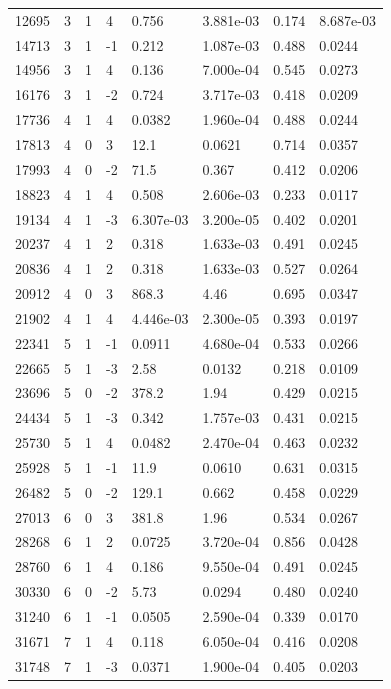 \documentclass[preview]{standalone}
\begin{document}
{{\begin{tabular}{L{1.2cm}C{1.2cm} C{0.3cm}C{0.5cm} C{1.4cm}C{1.4cm} C{1.4cm}C{1.4cm}}
  12695  &     3  & 1     &  4 &  0.756  & 3.881e-03  & 0.174 &  8.687e-03   \\ 
  14713  &     3  & 1     & -1 &  0.212  & 1.087e-03  & 0.488 &  0.0244   \\ 
  14956  &     3  & 1     &  4 &  0.136  & 7.000e-04  & 0.545 &  0.0273   \\ 
  16176  &     3  & 1     & -2 &  0.724  & 3.717e-03  & 0.418 &  0.0209   \\ 
  17736  &     4  & 1     &  4 &  0.0382  & 1.960e-04  & 0.488 &  0.0244   \\ 
  17813  &     4  & 0     &  3 &  12.1  & 0.0621  & 0.714 &  0.0357   \\ 
  17993  &     4  & 0     & -2 &  71.5  & 0.367  & 0.412 &  0.0206   \\ 
  18823  &     4  & 1     &  4 &  0.508  & 2.606e-03  & 0.233 &  0.0117   \\ 
  19134  &     4  & 1     & -3 &  6.307e-03  & 3.200e-05  & 0.402 &  0.0201   \\ 
  20237  &     4  & 1     &  2 &  0.318  & 1.633e-03  & 0.491 &  0.0245   \\ 
  20836  &     4  & 1     &  2 &  0.318  & 1.633e-03  & 0.527 &  0.0264   \\ 
  20912  &     4  & 0     &  3 &  868.3  & 4.46  & 0.695 &  0.0347   \\ 
  21902  &     4  & 1     &  4 &  4.446e-03  & 2.300e-05  & 0.393 &  0.0197   \\ 
  22341  &     5  & 1     & -1 &  0.0911  & 4.680e-04  & 0.533 &  0.0266   \\ 
  22665  &     5  & 1     & -3 &  2.58  & 0.0132  & 0.218 &  0.0109   \\ 
  23696  &     5  & 0     & -2 &  378.2  & 1.94  & 0.429 &  0.0215   \\ 
  24434  &     5  & 1     & -3 &  0.342  & 1.757e-03  & 0.431 &  0.0215   \\ 
  25730  &     5  & 1     &  4 &  0.0482  & 2.470e-04  & 0.463 &  0.0232   \\ 
  25928  &     5  & 1     & -1 &  11.9  & 0.0610  & 0.631 &  0.0315   \\ 
  26482  &     5  & 0     & -2 &  129.1  & 0.662  & 0.458 &  0.0229   \\ 
  27013  &     6  & 0     &  3 &  381.8  & 1.96  & 0.534 &  0.0267   \\ 
  28268  &     6  & 1     &  2 &  0.0725  & 3.720e-04  & 0.856 &  0.0428   \\ 
  28760  &     6  & 1     &  4 &  0.186  & 9.550e-04  & 0.491 &  0.0245   \\ 
  30330  &     6  & 0     & -2 &  5.73  & 0.0294  & 0.480 &  0.0240   \\ 
  31240  &     6  & 1     & -1 &  0.0505  & 2.590e-04  & 0.339 &  0.0170   \\ 
  31671  &     7  & 1     &  4 &  0.118  & 6.050e-04  & 0.416 &  0.0208   \\ 
  31748  &     7  & 1     & -3 &  0.0371  & 1.900e-04  & 0.405 &  0.0203   \\ 
\hline 
\end{tabular} 

}}
\end{document}
